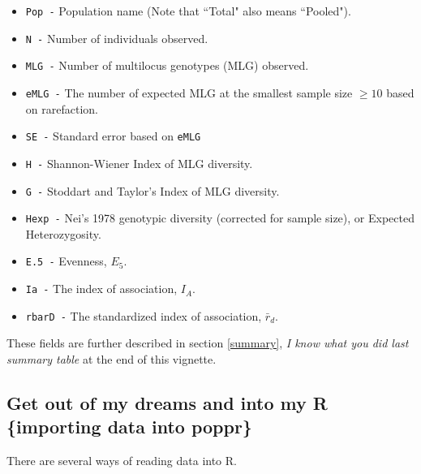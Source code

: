 \documentclass[letterpaper]{article}
\begin{document}
\begin{itemize}
  \item \texttt{Pop -} Population name (Note that ``Total" also means ``Pooled").
  \item \texttt{N -} Number of individuals observed.
  \item \texttt{MLG -} Number of multilocus genotypes (MLG) observed.
  \item \texttt{eMLG -} The number of expected MLG at the smallest sample size $\geq 10$ based on rarefaction. \cite{Hurlbert:1971}
  \item \texttt{SE -} Standard error based on \texttt{eMLG} \cite{Heck:1975}
  \item \texttt{H -} Shannon-Wiener Index of MLG diversity. \cite{Shannon:1948}
  \item \texttt{G -} Stoddart and Taylor's Index of MLG diversity. \cite{Stoddart:1988}
  \item \texttt{Hexp -} Nei's 1978 genotypic diversity (corrected for sample size), or  Expected Heterozygosity. \cite{Nei:1978}
  \item \texttt{E.5 -} Evenness, $E_5$. \cite{Pielou:1975}\cite{Ludwig:1988}\cite{Grunwald:2003}
  \item \texttt{Ia -} The index of association, $I_A$. \cite{Brown:1980} \cite{Smith:1993} \cite{Agapow:2001}
  \item \texttt{rbarD -} The standardized index of association, $\bar r_d$. \cite{Agapow:2001}
\end{itemize}
These fields are further described in section \ref{summary}, \textit{I know what you did last summary table} at the end of this vignette.

\subsection{Get out of my dreams and into my R \{importing data into poppr\}}\label{intro:import}
There are several ways of reading data into R. 
\end{document}
